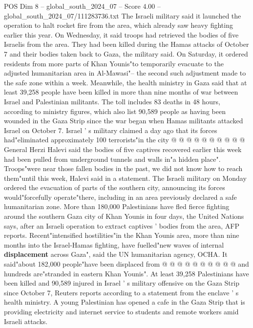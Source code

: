 \begin{textsample}{POS Dim 8 – global\_south\_2024\_07 – Score 4.00 – global\_south\_2024\_07/111283736.txt}  \label{ex:f8_pos_334}
The Israeli military said it launched the operation to halt rocket fire from the area, which already saw heavy fighting earlier this year.
On Wednesday, it said troops had retrieved the bodies of five Israelis from the area.
They had been killed during the Hamas attacks of October 7 and their bodies taken back to Gaza, the military said.
On Saturday, it ordered residents from more parts of Khan Younis"to temporarily evacuate to the adjusted humanitarian area in Al-Mawasi"-- the second such adjustment made to the safe zone within a week.
Meanwhile, the health ministry in Gaza said that at least 39,258 people have been killed in more than nine months of war between Israel and Palestinian militants.
The toll includes 83 deaths in 48 hours, according to ministry figures, which also list 90,589 people as having been wounded in the Gaza Strip since the war began when Hamas militants attacked Israel on October 7.
Israel ' s military claimed a day ago that its forces had"eliminated approximately 100 terrorists"in the city @ @ @ @ @ @ @ @ @ @ General Herzi Halevi said the bodies of five captives recovered earlier this week had been pulled from underground tunnels and walls in"a hidden place".
Troops"were near those fallen bodies in the past, we did not know how to reach them"until this week, Halevi said in a statement.
The Israeli military on Monday ordered the evacuation of parts of the southern city, announcing its forces would"forcefully operate"there, including in an area previously declared a safe humanitarian zone.
More than 180,000 Palestinians have fled fierce fighting around the southern Gaza city of Khan Younis in four days, the United Nations says, after an Israeli operation to extract captives ' bodies from the area, AFP reports.
Recent"intensified hostilities"in the Khan Younis area, more than nine months into the Israel-Hamas fighting, have fuelled"new waves of internal \textbf{displacement} across Gaza", said the UN humanitarian agency, OCHA.
It said"about 182,000 people"have been displaced from @ @ @ @ @ @ @ @ @ @ and hundreds are"stranded in eastern Khan Younis".
At least 39,258 Palestinians have been killed and 90,589 injured in Israel ' s military offensive on the Gaza Strip since October 7, Reuters reports according to a statement from the enclave ' s health ministry.
A young Palestinian has opened a cafe in the Gaza Strip that is providing electricity and internet service to students and remote workers amid Israeli attacks.

\end{textsample}
